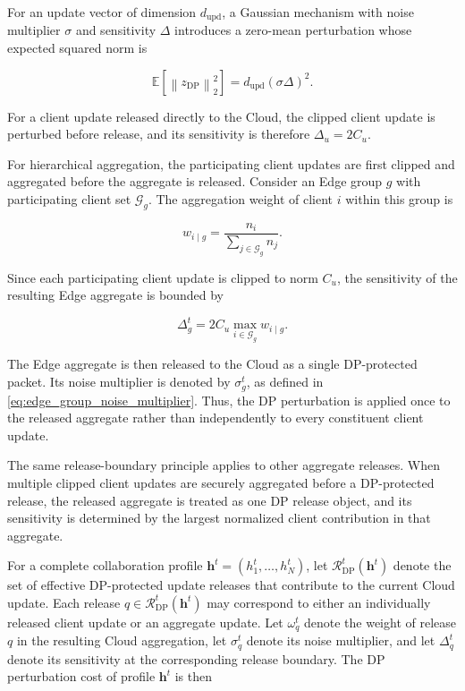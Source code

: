 \documentclass[5p,times]{elsarticle}
\theoremstyle{plain}
\theoremstyle{definition}
\theoremstyle{remark}
\begin{document}
For an update vector of dimension \(d_{\mathrm{upd}}\), a Gaussian mechanism
with noise multiplier \(\sigma\) and sensitivity \(\Delta\) introduces a
zero-mean perturbation whose expected squared norm is

\begin{equation}
\mathbb{E}
\left[
\left\|
z_{\mathrm{DP}}
\right\|_2^2
\right]
=
d_{\mathrm{upd}}
\left(
\sigma \Delta
\right)^2 .
\label{eq:gaussian_update_perturbation}
\end{equation}

For a client update released directly to the Cloud, the clipped client update
is perturbed before release, and its sensitivity is therefore
\(\Delta_u=2C_u\).

For hierarchical aggregation, the participating client updates are first
clipped and aggregated before the aggregate is released. Consider an Edge
group \(g\) with participating client set \(\mathcal G_g\). The aggregation
weight of client \(i\) within this group is

\begin{equation}
w_{i\mid g}
=
\frac{n_i}
{\sum_{j\in\mathcal G_g} n_j}.
\label{eq:edge_group_weight}
\end{equation}

Since each participating client update is clipped to norm \(C_u\), the
sensitivity of the resulting Edge aggregate is bounded by

\begin{equation}
\Delta_g^t
=
2C_u
\max_{i\in\mathcal G_g}
w_{i\mid g}.
\label{eq:edge_group_sensitivity}
\end{equation}

The Edge aggregate is then released to the Cloud as a single DP-protected
packet. Its noise multiplier is denoted by \(\sigma_g^t\), as defined in
\eqref{eq:edge_group_noise_multiplier}. Thus, the DP perturbation is applied
once to the released aggregate rather than independently to every constituent
client update.

The same release-boundary principle applies to other aggregate releases. When
multiple clipped client updates are securely aggregated before a DP-protected
release, the released aggregate is treated as one DP release object, and its
sensitivity is determined by the largest normalized client contribution in
that aggregate.

For a complete collaboration profile
\(\mathbf h^t=(h_1^t,\ldots,h_N^t)\), let
\(\mathcal R_{\mathrm{DP}}^t(\mathbf h^t)\) denote the set of effective
DP-protected update releases that contribute to the current Cloud update.
Each release \(q\in\mathcal R_{\mathrm{DP}}^t(\mathbf h^t)\) may correspond
to either an individually released client update or an aggregate update.
Let \(\omega_q^t\) denote the weight of release \(q\) in the resulting Cloud
aggregation, let \(\sigma_q^t\) denote its noise multiplier, and let
\(\Delta_q^t\) denote its sensitivity at the corresponding release boundary.
The DP perturbation cost of profile \(\mathbf h^t\) is then
\end{document}
